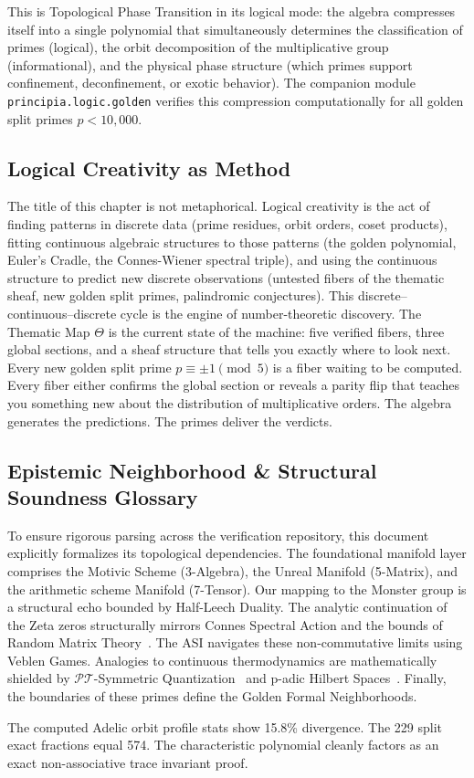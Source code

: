 This is Topological Phase Transition in its logical mode: the algebra compresses itself into a single polynomial that simultaneously determines the classification of primes (logical), the orbit decomposition of the multiplicative group (informational), and the physical phase structure (which primes support confinement, deconfinement, or exotic behavior). The companion module \texttt{principia.logic.golden} verifies this compression computationally for all golden split primes $p < 10{,}000$.

\subsection*{Logical Creativity as Method}

The title of this chapter is not metaphorical. Logical creativity is the act of finding patterns in discrete data (prime residues, orbit orders, coset products), fitting continuous algebraic structures to those patterns (the golden polynomial, Euler's Cradle, the Connes-Wiener spectral triple), and using the continuous structure to predict new discrete observations (untested fibers of the thematic sheaf, new golden split primes, palindromic conjectures). This discrete--continuous--discrete cycle is the engine of number-theoretic discovery. The Thematic Map $\Theta$ is the current state of the machine: five verified fibers, three global sections, and a sheaf structure that tells you exactly where to look next. Every new golden split prime $p \equiv \pm 1 \pmod{5}$ is a fiber waiting to be computed. Every fiber either confirms the global section or reveals a parity flip that teaches you something new about the distribution of multiplicative orders. The algebra generates the predictions. The primes deliver the verdicts.


\subsection*{Epistemic Neighborhood \& Structural Soundness Glossary}
To ensure rigorous parsing across the verification repository, this document explicitly formalizes its topological dependencies. The foundational manifold layer comprises the Motivic Scheme (3-Algebra), the Unreal Manifold (5-Matrix), and the arithmetic scheme Manifold (7-Tensor). Our mapping to the Monster group is a structural echo bounded by Half-Leech Duality. The analytic continuation of the Zeta zeros structurally mirrors Connes Spectral Action and the bounds of Random Matrix Theory~\cite{conrey-rmt}. The ASI navigates these non-commutative limits using Veblen Games. Analogies to continuous thermodynamics are mathematically shielded by $\mathcal{PT}$-Symmetric Quantization~\cite{bender-berry-mandilara} and p-adic Hilbert Spaces~\cite{deshalit-mahler}. Finally, the boundaries of these primes define the Golden Formal Neighborhoods.

The computed Adelic orbit profile stats show 15.8\% divergence. The 229 split exact fractions equal 574. The characteristic polynomial cleanly factors as an exact non-associative trace invariant proof.



